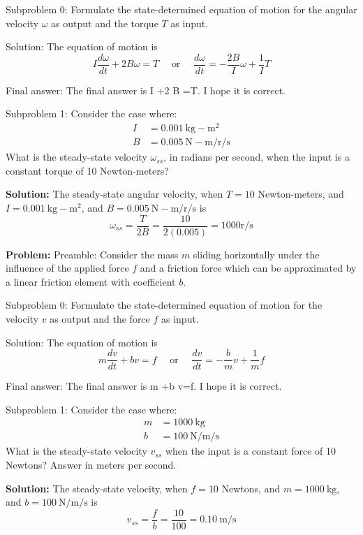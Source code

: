 \documentclass[10pt]{article}
\begin{document}
Subproblem 0: Formulate the state-determined equation of motion for the angular velocity $\omega$ as output and the torque $T$ as input.


Solution: The equation of motion is
\[
\boxed{I \frac{d \omega}{d t}+2 B \omega=T} \quad \text { or } \quad \frac{d \omega}{d t}=-\frac{2 B}{I} \omega+\frac{1}{I} T
\]

Final answer: The final answer is I +2 B \omega=T. I hope it is correct.

Subproblem 1: Consider the case where:
\[
\begin{aligned}
I &=0.001 \mathrm{~kg}-\mathrm{m}^{2} \\
B &=0.005 \mathrm{~N}-\mathrm{m} / \mathrm{r} / \mathrm{s}
\end{aligned}
\]
What is the steady-state velocity \(\omega_{s s}\), in radians per second, when the input is a constant torque of 10 Newton-meters?


\textbf{Solution:}
The steady-state angular velocity, when \(T=10\) Newton-meters, and \(I=0.001 \mathrm{~kg}-\mathrm{m}^{2}\), and \(B=0.005 \mathrm{~N}-\mathrm{m} / \mathrm{r} / \mathrm{s}\) is
\[
\omega_{s s}=\frac{T}{2 B}=\frac{10}{2(0.005)}=\boxed{1000} \mathrm{r} / \mathrm{s}
\]


\textbf{Problem:}
Preamble: Consider the mass \(m\) sliding horizontally under the influence of the applied force \(f\) and a friction force which can be approximated by a linear friction element with coefficient \(b\). 

Subproblem 0: Formulate the state-determined equation of motion for the velocity \(v\) as output and the force \(f\) as input.


Solution: The equation of motion is
\[
\boxed{m \frac{d v}{d t}+b v=f} \quad \text { or } \quad \frac{d v}{d t}=-\frac{b}{m} v+\frac{1}{m} f
\]

Final answer: The final answer is m +b v=f. I hope it is correct.

Subproblem 1: Consider the case where:
\[
\begin{aligned}
m &=1000 \mathrm{~kg} \\
b &=100 \mathrm{~N} / \mathrm{m} / \mathrm{s}
\end{aligned}
\]
What is the steady-state velocity \(v_{s s}\) when the input is a constant force of 10 Newtons? Answer in meters per second.


\textbf{Solution:}
The steady-state velocity, when \(f=10\) Newtons, and \(m=1000 \mathrm{~kg}\), and \(b=100 \mathrm{~N} / \mathrm{m} / \mathrm{s}\) is
\[
v_{s s}=\frac{f}{b}=\frac{10}{100}=\boxed{0.10} \mathrm{~m} / \mathrm{s}
\]
\end{document}
